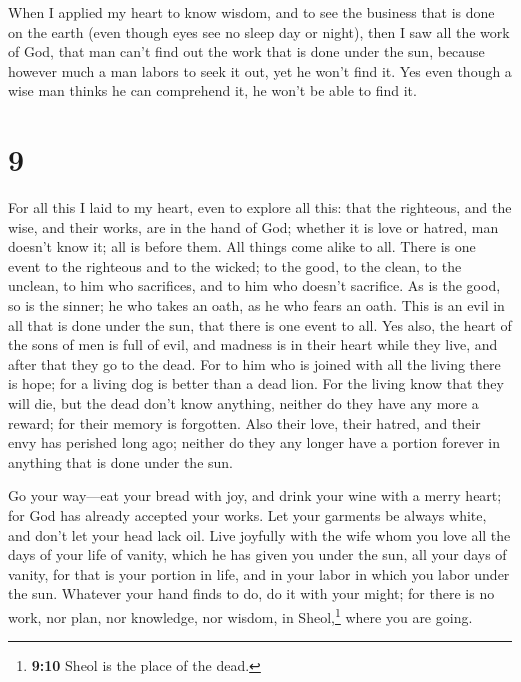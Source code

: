  When I applied my heart to know wisdom, and to see the
business that is done on the earth (even though eyes see no sleep day or
night),  then I saw all the work of God, that man can't
find out the work that is done under the sun, because however much a man
labors to seek it out, yet he won't find it. Yes even though a wise man
thinks he can comprehend it, he won't be able to find it.

\hypertarget{section-8}{%
\section{9}\label{section-8}}

 For all this I laid to my heart, even to explore all
this: that the righteous, and the wise, and their works, are in the hand
of God; whether it is love or hatred, man doesn't know it; all is before
them.  All things come alike to all. There is one event to
the righteous and to the wicked; to the good, to the clean, to the
unclean, to him who sacrifices, and to him who doesn't sacrifice. As is
the good, so is the sinner; he who takes an oath, as he who fears an
oath.  This is an evil in all that is done under the sun,
that there is one event to all. Yes also, the heart of the sons of men
is full of evil, and madness is in their heart while they live, and
after that they go to the dead.  For to him who is joined
with all the living there is hope; for a living dog is better than a
dead lion.  For the living know that they will die, but
the dead don't know anything, neither do they have any more a reward;
for their memory is forgotten.  Also their love, their
hatred, and their envy has perished long ago; neither do they any longer
have a portion forever in anything that is done under the sun.

 Go your way---eat your bread with joy, and drink your
wine with a merry heart; for God has already accepted your works.
 Let your garments be always white, and don't let your
head lack oil.  Live joyfully with the wife whom you love
all the days of your life of vanity, which he has given you under the
sun, all your days of vanity, for that is your portion in life, and in
your labor in which you labor under the sun.  Whatever
your hand finds to do, do it with your might; for there is no work, nor
plan, nor knowledge, nor wisdom, in Sheol,\footnote{\textbf{9:10} Sheol
  is the place of the dead.} where you are going.

